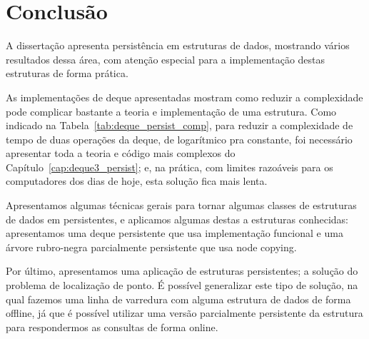 \documentclass[../../main.tex]{subfiles}
\begin{document}
\setcounter{secnumdepth}{0}

\chapter*{Conclusão}

A dissertação apresenta persistência em estruturas de dados, mostrando vários resultados dessa área, com atenção especial para a implementação destas estruturas de forma prática.

As implementações de deque apresentadas mostram como reduzir a complexidade pode complicar bastante a teoria e implementação de uma estrutura. Como indicado na Tabela~\ref{tab:deque_persist_comp}, para reduzir a complexidade de tempo de duas operações da deque, de logarítmico pra constante, foi necessário apresentar toda a teoria e código mais complexos do Capítulo~\ref{cap:deque3_persist}; e, na prática, com limites razoáveis para os computadores dos dias de hoje, esta solução fica mais lenta.

Apresentamos algumas técnicas gerais para tornar algumas classes de estruturas de dados em persistentes, e aplicamos algumas destas a estruturas conhecidas: apresentamos uma deque persistente que usa implementação funcional e uma árvore rubro-negra parcialmente persistente que usa node copying.

Por último, apresentamos uma aplicação de estruturas persistentes; a solução do problema de localização de ponto. É possível generalizar este tipo de solução, na qual fazemos uma linha de varredura com alguma estrutura de dados de forma offline, já que é possível utilizar uma versão parcialmente persistente da estrutura para respondermos as consultas de forma online.

\setcounter{secnumdepth}{1}
\end{document}
